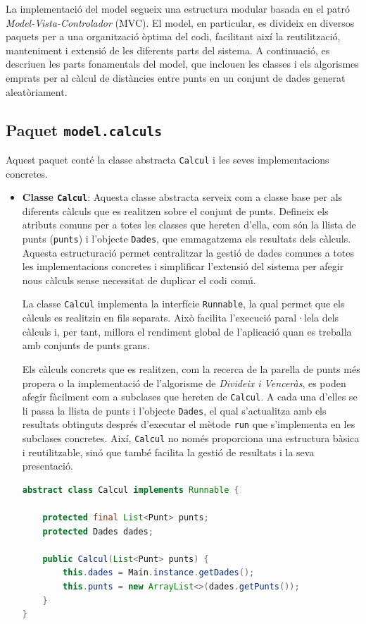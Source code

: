 \documentclass{ieeetj}
\begin{document}
La implementació del model segueix una estructura modular basada en el patró \textit{Model-Vista-Controlador} (MVC). El model, en particular, es divideix en diversos paquets per a una organització òptima del codi, facilitant així la reutilització, manteniment i extensió de les diferents parts del sistema. A continuació, es descriuen les parts fonamentals del model, que inclouen les classes i els algorismes emprats per al càlcul de distàncies entre punts en un conjunt de dades generat aleatòriament.

\subsection{Paquet \texttt{model.calculs}}

Aquest paquet conté la classe abstracta \texttt{Calcul} i les seves implementacions concretes.

\begin{itemize} \item \textbf{Classe \texttt{Calcul}}: Aquesta classe abstracta serveix com a classe base per als diferents càlculs que es realitzen sobre el conjunt de punts. Defineix els atributs comuns per a totes les classes que hereten d'ella, com són la llista de punts (\texttt{punts}) i l'objecte \texttt{Dades}, que emmagatzema els resultats dels càlculs. Aquesta estructuració permet centralitzar la gestió de dades comunes a totes les implementacions concretes i simplificar l'extensió del sistema per afegir nous càlculs sense necessitat de duplicar el codi comú.

La classe \texttt{Calcul} implementa la interfície \texttt{Runnable}, la qual permet que els càlculs es realitzin en fils separats. Això facilita l'execució paral·lela dels càlculs i, per tant, millora el rendiment global de l'aplicació quan es treballa amb conjunts de punts grans.

Els càlculs concrets que es realitzen, com la recerca de la parella de punts més propera o la implementació de l'algorisme de \textit{Divideix i Venceràs}, es poden afegir fàcilment com a subclases que hereten de \texttt{Calcul}. A cada una d'elles se li passa la llista de punts i l'objecte \texttt{Dades}, el qual s'actualitza amb els resultats obtinguts després d'executar el mètode \texttt{run} que s'implementa en les subclases concretes. Així, \texttt{Calcul} no només proporciona una estructura bàsica i reutilitzable, sinó que també facilita la gestió de resultats i la seva presentació.

\begin{lstlisting}[language=java]
abstract class Calcul implements Runnable {

    protected final List<Punt> punts;
    protected Dades dades;

    public Calcul(List<Punt> punts) {
        this.dades = Main.instance.getDades();
        this.punts = new ArrayList<>(dades.getPunts());
    }
}
\end{lstlisting}

\end{itemize}
\end{document}
